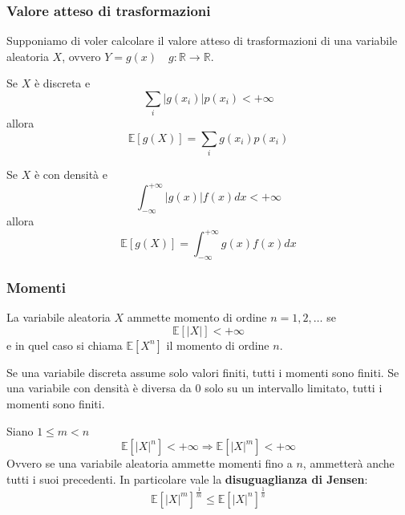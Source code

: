 \subsubsection{Valore atteso di trasformazioni}
Supponiamo di voler calcolare il valore atteso di trasformazioni di una variabile aleatoria $X$, ovvero $Y=g(x) \quad g:\mathbb{R} \to \mathbb{R}$.
\begin{proposition}
	Se $X$ è discreta e
	\begin{equation*}
		\sum_{i} \lvert g(x_i) \rvert p(x_i) < +\infty
	\end{equation*}
	allora
	\begin{equation}
		\mathbb{E}[g(X)] = \sum_{i} g(x_i)p(x_i)
	\end{equation}
\end{proposition}
\begin{proposition}
	Se $X$ è con densità e
	\begin{equation*}
		\int_{-\infty}^{+\infty}\lvert g(x)\rvert f(x)dx < +\infty
	\end{equation*}
	allora
	\begin{equation}
		\mathbb{E}[g(X)] = \int_{-\infty}^{+\infty} g(x) f(x)dx
	\end{equation}
\end{proposition}
	
\subsubsection{Momenti}
\begin{definition}[Momento]
	La variabile aleatoria $X$ ammette momento di ordine $n=1,2,\ldots$ se
	\begin{equation*}
		\mathbb{E} [\lvert X \rvert] < + \infty
	\end{equation*}
	e in quel caso si chiama $\mathbb{E}[X^n]$ il momento di ordine $n$.
\end{definition}

\begin{observation}
	Se una variabile discreta assume solo valori finiti, tutti i momenti sono finiti. Se una variabile con densità è diversa da $0$ solo su un intervallo limitato, tutti i momenti sono finiti.
\end{observation}

\begin{proposition}
	Siano $1 \leq m < n$
	\begin{equation}
		\mathbb{E}[\lvert X \rvert ^n] < +\infty \Longrightarrow \mathbb{E}[\lvert X \rvert ^m] < +\infty
	\end{equation}
	Ovvero se una variabile aleatoria ammette momenti fino a $n$, ammetterà anche tutti i suoi precedenti. In particolare vale la \textbf{disuguaglianza di Jensen}:
	\begin{equation}
		\mathbb{E}[\lvert X \rvert^m]^{\frac{1}{m}} \leq \mathbb{E}[\lvert X \rvert^n]^{\frac{1}{n}}
	\end{equation}
\end{proposition}

